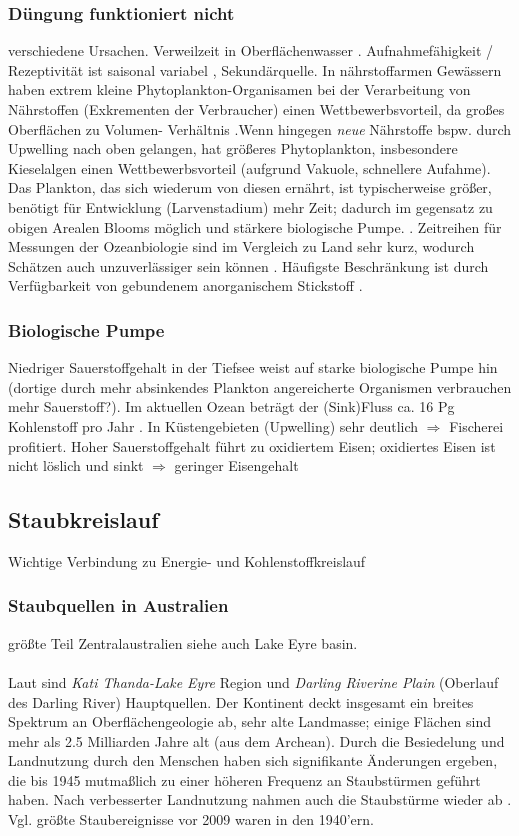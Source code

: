 \documentclass[12pt,a4paper,onecolumn]{scrartcl}
\begin{document}
\subsubsection{Düngung funktioniert nicht}
verschiedene Ursachen. Verweilzeit in Oberflächenwasser \citep{Hayes.2015}. Aufnahmefähigkeit / Rezeptivität ist saisonal variabel \citep{Gabric.2016}, Sekundärquelle. In nährstoffarmen Gewässern haben extrem kleine Phytoplankton-Organisamen bei der Verarbeitung von Nährstoffen (Exkrementen der Verbraucher) einen Wettbewerbsvorteil, da großes Oberflächen zu Volumen- Verhältnis \citep{Falkowski.1998}.Wenn hingegen \textit{neue} Nährstoffe bspw. durch Upwelling nach oben gelangen, hat größeres Phytoplankton, insbesondere Kieselalgen einen Wettbewerbsvorteil (aufgrund Vakuole, schnellere Aufahme). Das Plankton, das sich wiederum von diesen ernährt, ist typischerweise größer, benötigt für Entwicklung (Larvenstadium) mehr Zeit; dadurch im gegensatz zu obigen Arealen Blooms möglich und stärkere biologische Pumpe. \citep{Falkowski.1998}. Zeitreihen für Messungen der Ozeanbiologie sind im Vergleich zu Land sehr kurz, wodurch Schätzen auch unzuverlässiger sein können \citep{Falkowski.1998}. Häufigste Beschränkung ist durch Verfügbarkeit von gebundenem anorganischem Stickstoff \citep{Falkowski.1998}.
\subsubsection{Biologische Pumpe}
Niedriger Sauerstoffgehalt in der Tiefsee weist auf starke biologische Pumpe hin (dortige durch mehr absinkendes Plankton angereicherte Organismen verbrauchen mehr Sauerstoff?). Im aktuellen Ozean beträgt der (Sink)Fluss ca. 16 Pg Kohlenstoff pro Jahr \citep{Falkowski.1998}. In Küstengebieten (Upwelling) sehr deutlich $\Rightarrow$ Fischerei profitiert. Hoher Sauerstoffgehalt führt zu oxidiertem Eisen; oxidiertes Eisen ist nicht löslich und sinkt $\Rightarrow$ geringer Eisengehalt \citep{Falkowski.1998}


\subsection{Staubkreislauf}
Wichtige Verbindung zu Energie- und Kohlenstoffkreislauf \citep{Shao.2011}
\subsubsection{Staubquellen in Australien}
größte Teil Zentralaustralien \citep{Shao.2011} siehe auch Lake Eyre basin. \\\\
Laut \citet{Deckker.2019} sind \textit{Kati Thanda-Lake Eyre} Region und \textit{Darling Riverine Plain} (Oberlauf des Darling River) Hauptquellen. Der Kontinent deckt insgesamt ein breites Spektrum an Oberflächengeologie ab, sehr alte Landmasse; einige Flächen sind mehr als 2.5 Milliarden Jahre alt (aus dem Archean). Durch die Besiedelung und Landnutzung durch den Menschen haben sich signifikante Änderungen ergeben, die bis 1945 mutmaßlich zu einer höheren Frequenz an Staubstürmen geführt haben. Nach verbesserter Landnutzung nahmen auch die Staubstürme wieder ab \citep{Deckker.2019}. Vgl. größte Staubereignisse vor 2009 waren in den 1940'ern.
\end{document}
